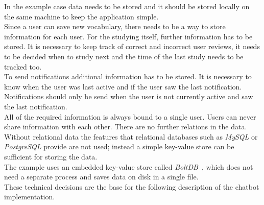 In the example case data needs to be stored and it should be stored locally on the same machine
to keep the application simple.
\\
Since a user can save new vocabulary,
there needs to be a way to store information for each user.
For the studying itself, further information has to be stored.
It is necessary to keep track of correct and incorrect user reviews, it needs to be decided when to study next and the time of the last study needs to be tracked too.
\\
To send notifications additional information has to be stored.
It is necessary to know when the user was last active and if the user saw the last notification.
Notifications should only be send when the user is not currently active and saw the last notification.
\\
All of the required information is always bound to a single user.
Users can never share information with each other.
There are no further relations in the data.
Without relational data the features that relational databases such as \emph{MySQL} or \emph{PostgreSQL} provide are not used;
instead a simple key-value store can be sufficient for storing the data.
\\
The example uses an embedded key-value store called \emph{BoltDB}~\cite{boltdb}, which does not need a separate process and saves data on disk in a single file.
\\


These technical decisions are the base for the following description of the chatbot implementation.
